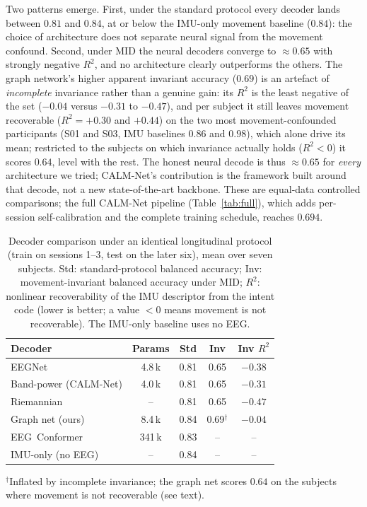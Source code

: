 \documentclass[journal]{IEEEtran}
\begin{document}
Two patterns emerge. First, under the standard protocol every decoder lands between
$0.81$ and $0.84$, at or below the IMU-only movement baseline ($0.84$): the choice of
architecture does not separate neural signal from the movement confound. Second,
under MID the neural decoders converge to $\approx\!0.65$ with strongly negative
$R^2$, and no architecture clearly outperforms the others. The graph network's higher
apparent invariant accuracy ($0.69$) is an artefact of \emph{incomplete} invariance
rather than a genuine gain: its $R^2$ is the least negative of the set ($-0.04$ versus
$-0.31$ to $-0.47$), and per subject it still leaves movement recoverable ($R^2=+0.30$
and $+0.44$) on the two most movement-confounded participants (S01 and S03, IMU
baselines $0.86$ and $0.98$), which alone drive its mean; restricted to the subjects
on which invariance actually holds ($R^2<0$) it scores $0.64$, level with the rest.
The honest neural decode is thus $\approx\!0.65$ for \emph{every} architecture we
tried; CALM-Net's contribution is the framework built around that decode, not a new
state-of-the-art backbone. These are equal-data controlled comparisons; the full
CALM-Net pipeline (Table~\ref{tab:full}), which adds per-session self-calibration and
the complete training schedule, reaches $0.694$.

\begin{table}[t]
\caption{Decoder comparison under an identical longitudinal protocol (train on
sessions 1--3, test on the later six), mean over seven subjects. Std: standard-protocol
balanced accuracy; Inv: movement-invariant balanced accuracy under MID; $R^2$:
nonlinear recoverability of the IMU descriptor from the intent code (lower is better;
a value ${<}0$ means movement is not recoverable). The IMU-only baseline uses no EEG.}
\label{tab:arch}
\centering
\begin{tabular}{lcccc}
\toprule
Decoder & Params & Std & Inv & Inv $R^2$ \\
\midrule
EEGNet~\cite{lawhern2018}       & 4.8\,k & 0.81 & 0.65 & $-0.38$ \\
Band-power (CALM-Net)           & 4.0\,k & 0.81 & 0.65 & $-0.31$ \\
Riemannian~\cite{barachant2012} & --     & 0.81 & 0.65 & $-0.47$ \\
Graph net (ours)                & 8.4\,k & 0.84 & 0.69$^\dagger$ & $-0.04$ \\
EEG~Conformer~\cite{song2023}   & 341\,k & 0.83 & --   & -- \\
\midrule
IMU-only (no EEG)               & --     & 0.84 & --   & -- \\
\bottomrule
\end{tabular}

\vspace{2pt}
{\footnotesize $^\dagger$Inflated by incomplete invariance; the graph net scores
$0.64$ on the subjects where movement is not recoverable (see text).}
\end{table}
\end{document}
